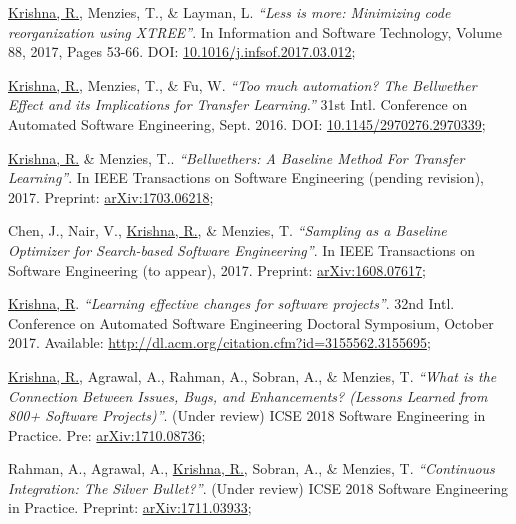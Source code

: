 \documentclass[letterpaper,9pt]{article}
\begin{document}
\begin{enumerate}[label={[\arabic*]}, leftmargin=15pt]

    \item\small \underline{Krishna, R.}, Menzies, T., \& Layman, L. \textit{``Less is more: Minimizing code reorganization using XTREE''}. In Information and Software Technology, Volume 88, 2017, Pages 53-66. DOI:  \href{https://arxiv.org/abs/1609.03614}{10.1016/j.infsof.2017.03.012}\vspace{-6pt};
    
    \item\small  \underline{Krishna, R.}, Menzies, T., \& Fu, W. \textit{``Too much automation? The Bellwether Effect and its Implications for Transfer Learning.''} 31st Intl. Conference on Automated Software Engineering, Sept. 2016. DOI: \href{https://doi.org/10.1145/2970276.2970339}{10.1145/2970276.2970339}\vspace{-6pt};
    
    \item\small \underline{Krishna, R.} \& Menzies, T.. \textit{``Bellwethers: A Baseline Method For Transfer Learning''}. In IEEE Transactions on Software Engineering (pending revision), 2017. Preprint: \href{https://arxiv.org/abs/1703.06218}{arXiv:1703.06218}\vspace{-6pt};
    
    \item\small Chen, J., Nair, V., \underline{Krishna, R.}, \& Menzies, T. \textit{``Sampling as a Baseline Optimizer for Search-based Software Engineering''}. In IEEE Transactions on Software Engineering (to appear), 2017. Preprint: \href{https://arxiv.org/abs/1608.07617}{arXiv:1608.07617}\vspace{-6pt};
    
    \item\small \underline{Krishna, R}. \textit{``Learning effective changes for software projects''}. 32nd Intl. Conference on Automated Software Engineering Doctoral Symposium, October 2017. Available: \href{https://arxiv.org/abs/1708.04589}{http://dl.acm.org/citation.cfm?id=3155562.3155695}\vspace{-6pt};
    
    \item\small \underline{Krishna, R.}, Agrawal, A., Rahman, A., Sobran, A., 
    \& Menzies, T. \textit{``What is the Connection Between Issues, Bugs, and 
    Enhancements? (Lessons Learned from 800+ Software Projects)''}. (Under 
    review) ICSE 2018 Software Engineering in Practice. Pre: 
    \href{https://arxiv.org/abs/1710.08736}{arXiv:1710.08736}\vspace{-6pt};
    
    \item\small Rahman, A., Agrawal, A., \underline{Krishna, R.}, Sobran, A., \& Menzies, T. \textit{``Continuous Integration: The Silver Bullet?''}. (Under review) ICSE 2018 Software Engineering in Practice. Preprint: \href{https://arxiv.org/abs/1711.03933}{arXiv:1711.03933}\vspace{-6pt};
\end{enumerate}
\end{document}
